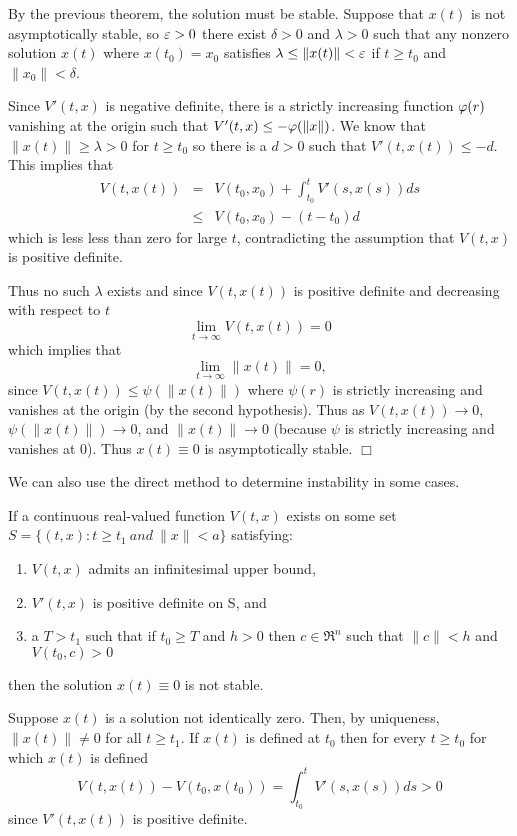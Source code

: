 \documentclass[nols]{tufte-handout}
\theoremstyle{definition}
\begin{document}
\pf  By the previous theorem, the solution must be stable.  Suppose
that $x(t)$ is not asymptotically stable, so \a $\varepsilon >0$ there exist
$\delta > 0$ and $\lambda > 0$ such that any nonzero solution $x(t)$ where
$x(t_0) = x_0$ satisfies $\lambda \le \| x(t) \| < \varepsilon$ if $t \ge
t_0$ and $\| x_0 \| < \delta$.

Since $V'(t,x)$ is negative definite, there is a strictly increasing function
$\varphi (r)$ vanishing at the origin such that $V'(t,x) \le -
\varphi(\| x \|)$.  We know that $\| x(t) \| \ge \lambda > 0$ for $t \ge
t_0$ so there is a $d > 0$ such that $V'(t,x(t)) \le -d$.  This
implies that 
\begin{eqnarray*}
	V(t,x(t)) & = & V(t_0,x_0) + \int^t_{t_0} V'(s,x(s)) ds \\
	& \le & V(t_0,x_0) - (t- t_0) d
\end{eqnarray*}
which is less less than zero for large $t$, contradicting the
assumption that $V(t,x)$ is positive definite.

Thus no such $\lambda$ exists and since $V(t,x(t))$ is positive definite and
decreasing with respect to $t$
$$\lim_{t \rightarrow \infty} V(t,x(t)) = 0$$
which implies that
$$\lim_{t \rightarrow \infty} \| x(t) \| = 0,$$
since $V(t,x(t)) \le \psi (\| x(t) \|)$ where $\psi (r)$ is strictly
increasing and vanishes at the origin (by the second hypothesis).
Thus as $V(t,x(t)) \rightarrow 0$, $\psi(\| x(t) \|) \rightarrow 0$,
and $\| x(t) \| \rightarrow 0$ (because $\psi$ is strictly increasing
and vanishes at 0).  Thus $x(t) \equiv 0$ is asymptotically stable. $\Box$

We can also use the direct method to determine instability in some cases.

\begin{thm}
	If a continuous real-valued function $V(t,x)$ exists on some set
$S = \{ (t,x) : t \ge t_1 \ and \ \| x \| < a \} $ satisfying:
\begin{enumerate}
\item $V(t,x)$ admits an infinitesimal upper bound,
\item $V'(t,x)$ is positive definite on S, and
\item \E a $T > t_1$ such that if $t_0 \ge T$ and $h > 0$ then \e $c
\in \Re^n$ such that $\| c \| < h$ and $V(t_0,c) > 0$
\end{enumerate}
then the solution $x(t) \equiv 0$ is not stable.
\end{thm}

\pf Suppose $x(t)$ is a solution not identically zero.  Then, by
uniqueness, $ \| x(t) \| \neq 0$ for all $t \ge t_1$.  If $x(t)$ is
defined at $t_0$ then for every $t \ge t_0$ for which $x(t)$ is
defined
$$V(t,x(t)) - V(t_0, x(t_0)) = \int^t_{t_0} V'(s,x(s)) ds > 0$$
since $V'(t,x(t))$ is positive definite.
\end{document}
